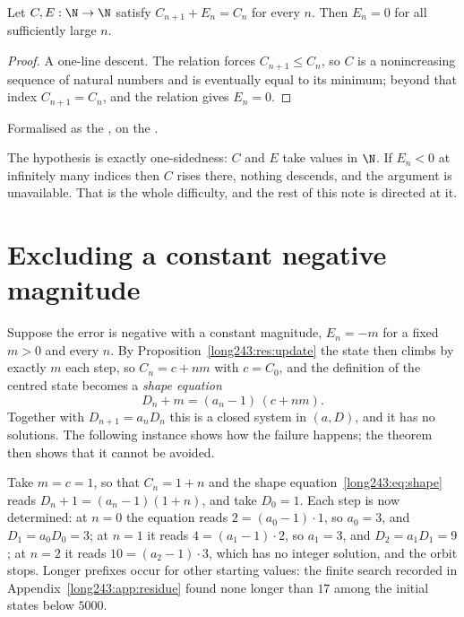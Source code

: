\begin{theorem}[descent]\label{long243:res:descent}
Let $C,E:\N\to\N$ satisfy $C_{n+1}+E_n=C_n$ for every $n$.  Then $E_n=0$ for
all sufficiently large $n$.
\end{theorem}

\begin{proof}
A one-line descent.  The relation forces $C_{n+1}\le C_n$, so $C$ is a nonincreasing sequence of
natural numbers and is eventually equal to its minimum; beyond that index
$C_{n+1}=C_n$, and the relation gives $E_n=0$.
\end{proof}

\noindent Formalised as the
, on the
.

The hypothesis is exactly one-sidedness: $C$ and $E$ take values in $\N$.  If
$E_n<0$ at infinitely many indices then $C$ rises there, nothing descends, and
the argument is unavailable.  That is the whole difficulty, and the rest of
this note is directed at it.

\section{Excluding a constant negative magnitude}\label{long243:sec:constant}

Suppose the error is negative with a constant magnitude, $E_n=-m$ for a fixed
$m>0$ and every $n$.  By
Proposition~\ref{long243:res:update} the state then climbs by exactly $m$ each step,
so $C_n=c+nm$ with $c=C_0$, and the definition of the centred state becomes a
\emph{shape equation}
\[
 D_n+m=(a_n-1)\,(c+nm) .
\tag{5.1}\label{long243:eq:shape}
\]
Together with $D_{n+1}=a_nD_n$ this is a closed system in $(a,D)$, and it has
no solutions.  The following instance shows how the failure happens; the
theorem then shows that it cannot be avoided.

\begin{example}\label{long243:ex:shape}
Take $m=c=1$, so that $C_n=1+n$ and the shape equation~\eqref{long243:eq:shape} reads
$D_n+1=(a_n-1)(1+n)$, and take $D_0=1$.  Each step is now determined: at $n=0$
the equation reads $2=(a_0-1)\cdot1$, so $a_0=3$, and $D_1=a_0D_0=3$; at $n=1$
it reads $4=(a_1-1)\cdot2$, so $a_1=3$, and $D_2=a_1D_1=9$; at $n=2$ it reads
$10=(a_2-1)\cdot3$, which has no integer solution, and the orbit stops.
Longer prefixes occur for other starting values: the finite search recorded in
Appendix~\ref{long243:app:residue} found none longer than $17$ among the initial
states below $5000$.
\end{example}

